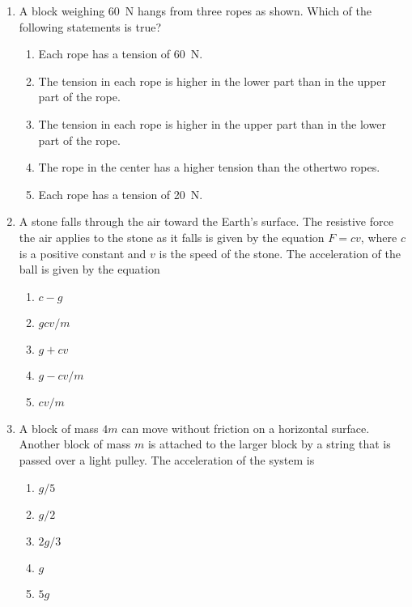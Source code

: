 \documentclass{../../oss-apphys}
\begin{document}
\begin{multicols}{2}
\begin{enumerate}[resume,leftmargin=18pt]
  \item A block weighing \SI{60}{\newton} hangs from three ropes as shown.
    Which of the following statements is true?
    \begin{center}
      \vspace{-.1in}
    \end{center}
    \begin{enumerate}[noitemsep,topsep=0pt,leftmargin=18pt,label=(\Alph*)]    
    \item Each rope has a tension of \SI{60}{\newton}.
    \item The tension in each rope is higher in the lower part than in the
      upper part of the rope.
    \item The tension in each rope is higher in the upper part than in the
      lower part of the rope.
    \item The rope in the center has a higher tension than the othertwo ropes.
    \item Each rope has a tension of \SI{20}{\newton}.
    \end{enumerate}
    
  \item A stone falls through the air toward the Earth's surface. The resistive
    force the air applies to the stone as it falls is given by the equation
    $F=cv$, where $c$ is a positive constant and $v$ is the speed of the stone.
    The acceleration of the ball is given by the equation
    \begin{enumerate}[noitemsep,topsep=0pt,leftmargin=18pt,label=(\Alph*)]
    \item $c-g$
    \item $gcv/m$
    \item $g+cv$
    \item $g-cv/m$
    \item $cv/m$
    \end{enumerate}
    \columnbreak
    
  \item A block of mass $4m$ can move without friction on a horizontal surface.
    Another block of mass $m$ is attached to the larger block by a string that
    is passed over a light pulley. The acceleration of the system is

    \vspace{-.1in}
    \begin{enumerate}[noitemsep,topsep=0pt,leftmargin=18pt,label=(\Alph*)]
    \item $g/5$
    \item $g/2$
    \item $2g/3$
    \item $g$
    \item $5g$
    \end{enumerate}


\end{enumerate}
\end{multicols}
\end{document}

